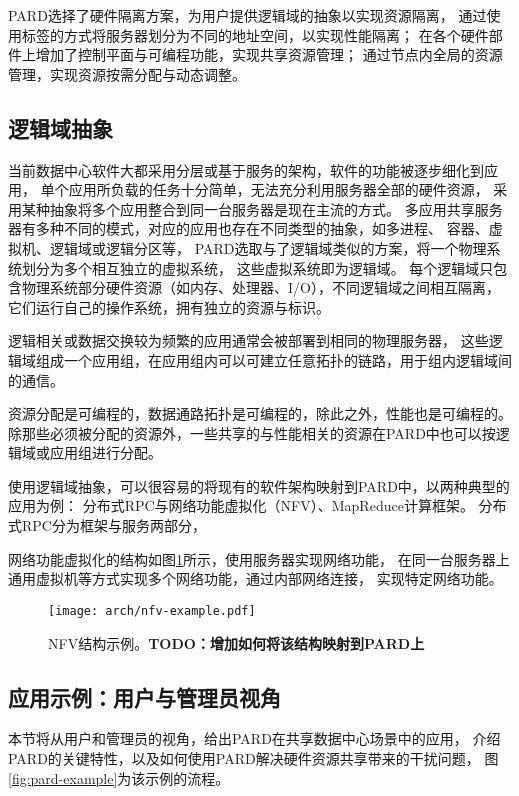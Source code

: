 PARD选择了硬件隔离方案，为用户提供逻辑域的抽象以实现资源隔离，
通过使用标签的方式将服务器划分为不同的地址空间，以实现性能隔离；
在各个硬件部件上增加了控制平面与可编程功能，实现共享资源管理；
通过节点内全局的资源管理，实现资源按需分配与动态调整。


\subsection{逻辑域抽象}

当前数据中心软件大都采用分层或基于服务的架构，软件的功能被逐步细化到应用，
单个应用所负载的任务十分简单，无法充分利用服务器全部的硬件资源，
采用某种抽象将多个应用整合到同一台服务器是现在主流的方式。
多应用共享服务器有多种不同的模式，对应的应用也存在不同类型的抽象，如多进程\cite{}、
容器\cite{}、虚拟机\cite{}、逻辑域\cite{}或逻辑分区\cite{}等，
PARD选取与了逻辑域类似的方案，将一个物理系统划分为多个相互独立的虚拟系统，
这些虚拟系统即为逻辑域。
每个逻辑域只包含物理系统部分硬件资源（如内存、处理器、I/O），不同逻辑域之间相互隔离，
它们运行自己的操作系统，拥有独立的资源与标识。

逻辑相关或数据交换较为频繁的应用通常会被部署到相同的物理服务器，
这些逻辑域组成一个应用组，在应用组内可以可建立任意拓扑的链路，用于组内逻辑域间的通信。

资源分配是可编程的，数据通路拓扑是可编程的，除此之外，性能也是可编程的。
除那些必须被分配的资源外，一些共享的与性能相关的资源在PARD中也可以按逻辑域或应用组进行分配。

使用逻辑域抽象，可以很容易的将现有的软件架构映射到PARD中，以两种典型的应用为例：
分布式RPC与网络功能虚拟化（NFV）、MapReduce计算框架。
分布式RPC分为框架与服务两部分，

网络功能虚拟化的结构如图\ref{fig:nfv-example}所示，使用服务器实现网络功能，
在同一台服务器上通用虚拟机等方式实现多个网络功能，通过内部网络连接，
实现特定网络功能。
\begin{figure}[tb]
  \centering
  \texttt{[image: arch/nfv-example.pdf]}
  \caption{NFV结构示例\cite{etsi_nfv_2014}。\textbf{TODO：增加如何将该结构映射到PARD上}}
  \label{fig:nfv-example}
\end{figure}

\subsection{应用示例：用户与管理员视角}

本节将从用户和管理员的视角，给出PARD在共享数据中心场景中的应用，
介绍PARD的关键特性，以及如何使用PARD解决硬件资源共享带来的干扰问题，
图\ref{fig:pard-example}为该示例的流程。

